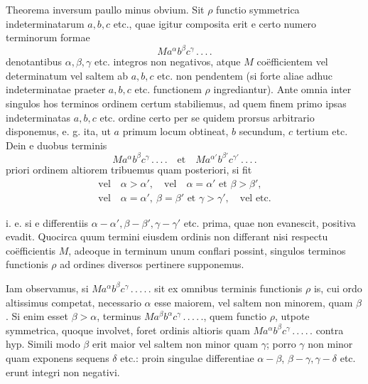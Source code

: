 Theorema inversum paullo minus obvium. Sit $\rho$ functio symmetrica indeterminatarum $a,b,c$ etc., quae igitur composita erit e certo numero terminorum
formae
\[
Ma^\alpha b^\beta c^\gamma\, .\, .\, .\, .
\]
denotantibus $\alpha,\beta,\gamma$ etc. integros non negativos, atque $M$ coëfficientem vel determinatum vel saltem ab $a,b,c$ etc. non pendentem (si forte aliae adhuc indeterminatae praeter $a,b,c$ etc. functionem $\rho$ ingrediantur). Ante omnia inter singulos hos terminos ordinem certum stabiliemus, ad quem finem primo ipsas indeterminatas $a,b,c$ etc. ordine certo per se quidem prorsus arbitrario disponemus, e. g. ita, ut $a$ primum locum obtineat, $b$ secundum, $c$ tertium etc. Dein
e duobus terminis
\[
Ma^\alpha b^\beta c^\gamma\, .\, .\, .\, .\quad\text{et}\quad Ma^{\alpha'}b^{\beta'}c^{\gamma'}\, .\, .\, .\, .
\]
priori ordinem altiorem tribuemus quam posteriori, si fit
\[
\begin{gathered}\text{vel}\quad\alpha>\alpha',\quad\text{vel}\quad\alpha=\alpha'\text{ et }\beta>\beta',\\\text{vel}\quad\alpha=\alpha',\ \beta=\beta'\text{ et }\gamma>\gamma',\quad\text{vel etc.}\end{gathered}
\]

i. e. si e differentiis $\alpha-\alpha',\beta-\beta',\gamma-\gamma'$ etc. prima, quae non evanescit, positiva evadit. Quocirca quum termini eiusdem ordinis non differant nisi respectu
coëfficientis $M$, adeoque in terminum unum conflari possint, singulos terminos
functionis $\rho$ ad ordines diversos pertinere supponemus.

Iam observamus, si $Ma^\alpha b^\beta c^\gamma\, .\, .\, .\, .\, .$ sit ex omnibus terminis functionis $\rho$ is,
cui ordo altissimus competat, necessario $\alpha$ esse maiorem, vel saltem non minorem, quam $\beta$. Si enim esset $\beta>\alpha$, terminus $Ma^\beta b^\alpha c^\gamma\, .\, .\, .\, .\, .$, quem functio $\rho$,
utpote symmetrica, quoque involvet, foret ordinis altioris quam $Ma^\alpha b^\beta c^\gamma\, .\, .\, .\, .\, .$
contra hyp. Simili modo $\beta$ erit maior vel saltem non minor quam $\gamma$; porro $\gamma$
non minor quam exponens sequens $\delta$ etc.: proin singulae differentiae $\alpha-\beta$,
$\beta-\gamma,\gamma-\delta$ etc. erunt integri non negativi.

